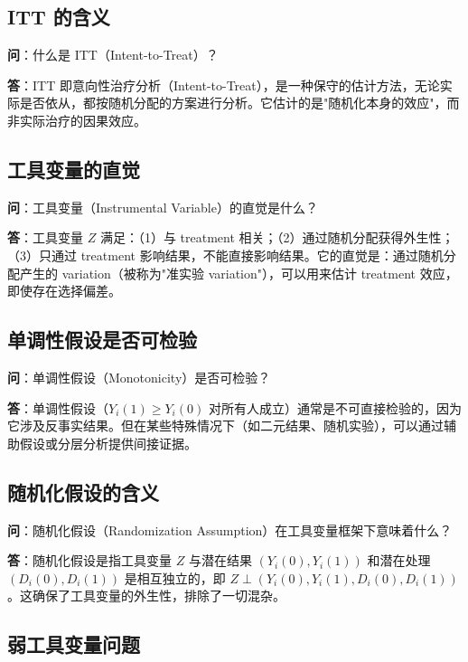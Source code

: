 \subsection{ITT 的含义}\label{sec:qa-itt-meaning}

\textbf{问}：什么是 ITT（Intent-to-Treat）？

\textbf{答}：ITT 即意向性治疗分析（Intent-to-Treat），是一种保守的估计方法，无论实际是否依从，都按随机分配的方案进行分析。它估计的是"随机化本身的效应"，而非实际治疗的因果效应。

\subsection{工具变量的直觉}\label{sec:qa-iv-intuition}

\textbf{问}：工具变量（Instrumental Variable）的直觉是什么？

\textbf{答}：工具变量 $Z$ 满足：（1）与 treatment 相关；（2）通过随机分配获得外生性；（3）只通过 treatment 影响结果，不能直接影响结果。它的直觉是：通过随机分配产生的 variation（被称为"准实验 variation"），可以用来估计 treatment 效应，即使存在选择偏差。

\subsection{单调性假设是否可检验}\label{sec:qa-monotonicity-testable}

\textbf{问}：单调性假设（Monotonicity）是否可检验？

\textbf{答}：单调性假设（$Y_i(1) \geq Y_i(0)$ 对所有人成立）通常是不可直接检验的，因为它涉及反事实结果。但在某些特殊情况下（如二元结果、随机实验），可以通过辅助假设或分层分析提供间接证据。

\subsection{随机化假设的含义}\label{sec:qa-randomization-assumption}

\textbf{问}：随机化假设（Randomization Assumption）在工具变量框架下意味着什么？

\textbf{答}：随机化假设是指工具变量 $Z$ 与潜在结果 $(Y_i(0), Y_i(1))$ 和潜在处理 $(D_i(0), D_i(1))$ 是相互独立的，即 $Z \perp (Y_i(0), Y_i(1), D_i(0), D_i(1))$。这确保了工具变量的外生性，排除了一切混杂。

\subsection{弱工具变量问题}\label{sec:qa-weak-iv-problem}

